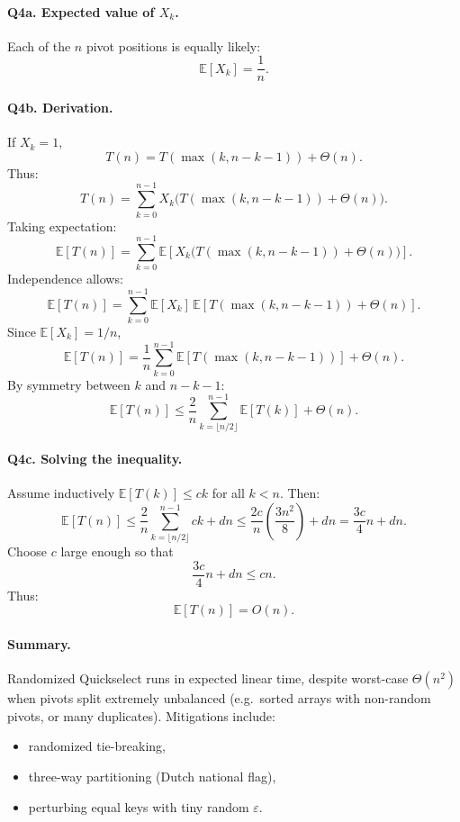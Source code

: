 \documentclass[9pt]{extarticle}
\begin{document}
\paragraph{Q4a. Expected value of $X_k$.}
Each of the $n$ pivot positions is equally likely:
\[
\mathbb{E}[X_k] = \frac{1}{n}.
\]

\paragraph{Q4b. Derivation.}
If $X_k = 1$,
\[
T(n) = T(\max(k, n-k-1)) + \Theta(n).
\]
Thus:
\[
T(n) = \sum_{k=0}^{n-1} X_k \bigl(T(\max(k,n-k-1)) + \Theta(n)\bigr). \tag{1}
\]
Taking expectation:
\[
\mathbb{E}[T(n)]
    = \sum_{k=0}^{n-1} \mathbb{E}\!\left[X_k \bigl(T(\max(k,n-k-1)) + \Theta(n)\bigr)\right]. \tag{2}
\]
Independence allows:
\[
\mathbb{E}[T(n)]
    = \sum_{k=0}^{n-1} \mathbb{E}[X_k]\,\mathbb{E}[T(\max(k,n-k-1)) + \Theta(n)]. \tag{3}
\]
Since $\mathbb{E}[X_k]=1/n$,
\[
\mathbb{E}[T(n)]
    = \frac{1}{n}\sum_{k=0}^{n-1} \mathbb{E}[T(\max(k,n-k-1))] + \Theta(n). \tag{4}
\]
By symmetry between $k$ and $n-k-1$:
\[
\mathbb{E}[T(n)]
    \le \frac{2}{n}\sum_{k=\lfloor n/2\rfloor}^{n-1} \mathbb{E}[T(k)] + \Theta(n). \tag{5}
\]

\paragraph{Q4c. Solving the inequality.}
Assume inductively $\mathbb{E}[T(k)] \le c k$ for all $k < n$.
Then:
\[
\mathbb{E}[T(n)]
    \le \frac{2}{n}\sum_{k=\lfloor n/2\rfloor}^{n-1} ck + d n
    \le \frac{2c}{n}\left(\frac{3n^2}{8}\right) + dn
    = \frac{3c}{4}n + dn.
\]
Choose $c$ large enough so that
\[
\frac{3c}{4}n + dn \le c n.
\]
Thus:
\[
\boxed{\mathbb{E}[T(n)] = O(n).}
\]

\paragraph{Summary.}
Randomized Quickselect runs in expected linear time, despite worst-case
$\Theta(n^2)$ when pivots split extremely unbalanced (e.g.\ sorted arrays with
non-random pivots, or many duplicates).  
Mitigations include:
\begin{itemize}
    \item randomized tie-breaking,
    \item three-way partitioning (Dutch national flag),
    \item perturbing equal keys with tiny random $\varepsilon$.
\end{itemize}
\end{document}
